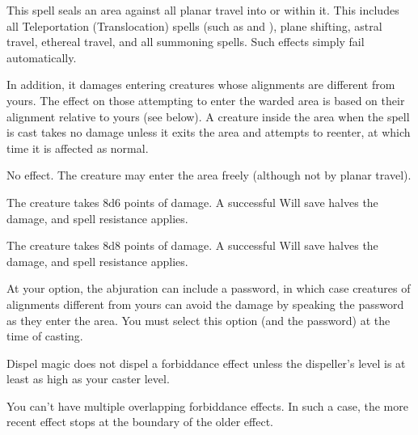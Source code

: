\spellrng{\rngmed}
\begin{spelleffect}
This spell seals an area against all planar travel into or within it. This includes all Teleportation (Translocation) spells (such as  and ), plane shifting, astral travel, ethereal travel, and all summoning spells. Such effects simply fail automatically.
\par In addition, it damages entering creatures whose alignments are different from yours. The effect on those attempting to enter the warded area is based on their alignment relative to yours (see below). A creature inside the area when the spell is cast takes no damage unless it exits the area and attempts to reenter, at which time it is affected as normal.
\par {} No effect. The creature may enter the area freely (although not by planar travel).
\par {} The creature takes 8d6 points of damage. A successful Will save halves the damage, and spell resistance applies.
\par {} The creature takes 8d8 points of damage. A successful Will save halves the damage, and spell resistance applies.
\par At your option, the abjuration can include a password, in which case creatures of alignments different from yours can avoid the damage by speaking the password as they enter the area. You must select this option (and the password) at the time of casting.
\end{spelleffect}
\begin{spellnotes}
\par Dispel magic does not dispel a forbiddance effect unless the dispeller's level is at least as high as your caster level.
\par You can't have multiple overlapping forbiddance effects. In such a case, the more recent effect stops at the boundary of the older effect.
\end{spellnotes}

